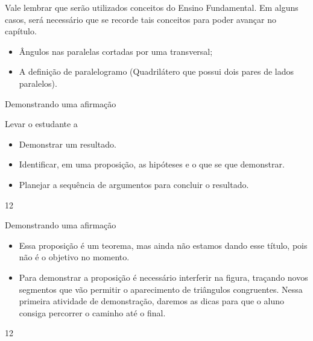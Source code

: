 \arrange{}
\begin{texto}
{\def\currentcolor{session4}
\begin{observation}
Vale lembrar que serão utilizados conceitos do Ensino Fundamental. Em alguns casos, será necessário que se recorde tais conceitos para poder avançar no capítulo.
\begin{itemize}
\item {} 
Ângulos nas paralelas cortadas por uma transversal;

\item {} 
A definição de paralelogramo (Quadrilátero que possui dois pares de lados paralelos).

\end{itemize}
\end{observation}
}
\end{texto}
\clearmargin
\begin{objectives}{Demonstrando uma afirmação}
{
Levar o estudante a
\begin{itemize}
\item {} 
Demonstrar um resultado.

\item {} 
Identificar, em uma proposição, as hipóteses e o que se que demonstrar.

\item {} 
Planejar a sequência de argumentos para concluir o resultado.

\end{itemize}

}{1}{2}
\end{objectives}
\begin{sugestions}{Demonstrando uma afirmação}
{
\begin{itemize}
\item {} 
Essa proposição é um teorema, mas ainda não estamos dando esse título, pois não é o objetivo no momento.

\item {} 
Para demonstrar a proposição é necessário interferir na figura, traçando novos segmentos que vão permitir o aparecimento de triângulos congruentes. Nessa primeira atividade de demonstração, daremos as dicas para que o aluno consiga percorrer o caminho até o final.

\end{itemize}
}{1}{2}
\end{sugestions}
